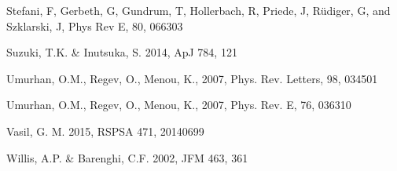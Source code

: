 \documentclass{emulateapj}
\begin{document}
\begin{thebibliography}{53}
Stefani, F, Gerbeth, G, Gundrum, T, Hollerbach, R, Priede, J, R\"udiger, G, and Szklarski, J, Phys Rev E, 80, 066303

Suzuki, T.K. \& Inutsuka, S. 2014, ApJ 784, 121

Umurhan, O.M., Regev, O., Menou, K., 2007, Phys. Rev. Letters, 98, 034501

Umurhan, O.M., Regev, O., Menou, K., 2007, Phys. Rev. E, 76, 036310

Vasil, G. M. 2015, RSPSA 471, 20140699

Willis, A.P. \& Barenghi, C.F. 2002, JFM 463, 361

\end{thebibliography}
\end{document}

